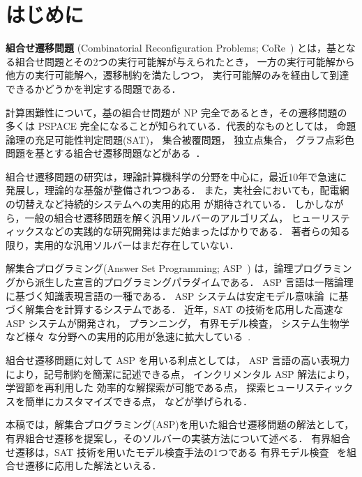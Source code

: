 ﻿%
\section{はじめに}\label{chap:introduction}

\textbf{組合せ遷移問題}
(Combinatorial Reconfiguration Problems;
CoRe~\cite{core:ItoDHPSUU11,core:Nishimura18,core:Heuvel13})
とは，基となる組合せ問題とその2つの実行可能解が与えられたとき，
一方の実行可能解から他方の実行可能解へ，遷移制約を満たしつつ，
実行可能解のみを経由して到達できるかどうかを判定する問題である．

計算困難性について，基の組合せ問題が NP 完全であるとき，その遷移問題の
多くは PSPACE 完全になることが知られている．代表的なものとしては，
命題論理の充足可能性判定問題(SAT)，
集合被覆問題，
独立点集合，
グラフ点彩色問題を基とする組合せ遷移問題などがある~\cite{%
  core:gcp:BonsmaC09,%
  core:gcp:CerecedaHJ11,%
  core:sat:GopalanKMP09,%
  core:ItoDHPSUU11%
}．

組合せ遷移問題の研究は，理論計算機科学の分野を中心に，最近10年で急速に
発展し，理論的な基盤が整備されつつある．
また，実社会においても，配電網の切替えなど持続的システムへの実用的応用
が期待されている．
しかしながら，一般の組合せ遷移問題を解く汎用ソルバーのアルゴリズム，
ヒューリスティックスなどの実践的な研究開発はまだ始まったばかりである．
著者らの知る限り，実用的な汎用ソルバーはまだ存在していない．

解集合プログラミング(Answer Set Programming; ASP~\cite{%
Baral03:cambridge,%
Gelfond88:iclp,%
Inoue08:jssst,%
Niemela99:amai})
は，論理プログラミングから派生した宣言的プログラミングパラダイムである．
ASP 言語は一階論理に基づく知識表現言語の一種である．
ASP システムは安定モデル意味論~\cite{Gelfond88:iclp}に基づく解集合を計算するシステムである．
近年，SAT の技術を応用した高速な ASP システムが開発され，
プランニング，
有界モデル検査，
システム生物学など様々
な分野への実用的応用が急速に拡大している~\cite{Erdem16:AI}.

組合せ遷移問題に対して ASP を用いる利点としては，
ASP 言語の高い表現力により，記号制約を簡潔に記述できる点，
インクリメンタル ASP 解法により，学習節を再利用した
効率的な解探索が可能である点，
探索ヒューリスティックスを簡単にカスタマイズできる点，
などが挙げられる．

本稿では，解集合プログラミング(ASP)を用いた組合せ遷移問題の解法として，
有界組合せ遷移を提案し，そのソルバーの実装方法について述べる．
有界組合せ遷移は，SAT 技術を用いたモデル検査手法の1つである
有界モデル検査~\cite{%
  JSAI:BanbaraT10,DBLP:series/faia/Biere09,DBLP:conf/tacas/BiereCCZ99}%
を組合せ遷移に応用した解法といえる．

